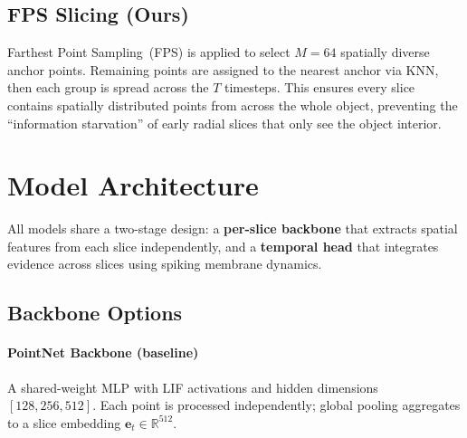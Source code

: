 \documentclass[11pt,a4paper]{article}
\begin{document}
\subsection{FPS Slicing (Ours)}

Farthest Point Sampling~(FPS) is applied to select $M = 64$ spatially diverse
anchor points. Remaining points are assigned to the nearest anchor via KNN,
then each group is spread across the $T$ timesteps. This ensures every slice
contains spatially distributed points from across the whole object, preventing
the ``information starvation'' of early radial slices that only see the object
interior.

\begin{algorithm}[H]
  \centering
  \caption{Hierarchical FPS temporal slicing.}
\end{algorithm}

\section{Model Architecture}

All models share a two-stage design: a \textbf{per-slice backbone} that extracts
spatial features from each slice independently, and a \textbf{temporal head} that
integrates evidence across slices using spiking membrane dynamics.

\subsection{Backbone Options}

\paragraph{PointNet Backbone (baseline)}
A shared-weight MLP with LIF activations and hidden dimensions $[128, 256, 512]$.
Each point is processed independently; global pooling aggregates to a slice embedding
$\mathbf{e}_t \in \mathbb{R}^{512}$.
\end{document}
